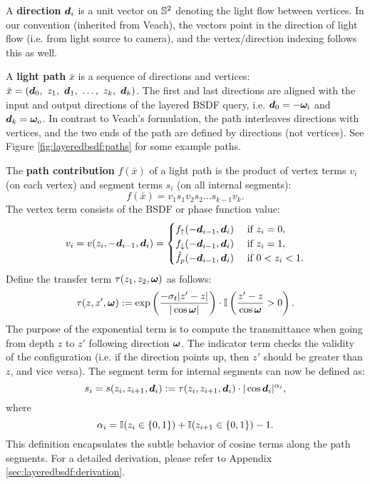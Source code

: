 A {\bf direction} $\bm{d}_i$ is a unit vector on $\mathbb{S}^2$ denoting the light flow between vertices. In our convention (inherited from Veach), 
the vectors point in the direction of light flow (i.e. from light source to camera), and the vertex/direction indexing follows this as well.

A {\bf light path} $\bar x$ is a sequence of directions and vertices: $\bar x = (\bmd_0,\ z_1,\ \bmd_1,\ \dots,\ z_k,\ \bmd_k)$.
The first and last directions are aligned with the input and output directions of the layered BSDF query, i.e. $\bm{d}_0 = -\bm\omega_\mathrm{i}$ and $\bm{d}_k = \bm\omega_\mathrm{o}$. In contrast to Veach's formulation, the path interleaves directions with vertices, and the two ends of the path are defined by directions (not vertices). See Figure \ref{fig:layeredbsdf:paths} for some example paths.



The {\bf path contribution} $f(\bar x)$ of a light path is the product of vertex terms $v_i$ (on each vertex) and segment terms $s_i$ (on all internal segments):
\begin{equation}
	f(\bar x) = v_1 s_1 v_2 s_2 \dots s_{k-1} v_k.
\end{equation}
The vertex term consists of the BSDF or phase function value:
\begin{equation}
\label{eqn:vtx_contrib}
v_i = v(z_i, -\bm{d}_{i - 1}, \bm{d}_i)
= \begin{cases}
	f_\uparrow(-\bm{d}_{i-1}, \bm{d}_i)   & \mbox{  if  } z_i = 0,\\
	f_\downarrow(-\bm{d}_{i-1}, \bm{d}_i) & \mbox{  if  } z_i = 1,\\
  	\hat{f}_p(-\bm{d}_{i-1}, \bm{d}_i)    & \mbox{  if  } 0 < z_i < 1.
\end{cases}
\end{equation}
Define the transfer term $\tau(z_1, z_2, \bm\omega)$ as follows:
\begin{equation}
\tau(z, z', \bm\omega) := \exp \left( \frac{-\sigma_t |z' - z|}{|\cos \bm\omega|} \right) \cdot \mathbb{I} \left( \frac{z' - z}{\cos \bm\omega} > 0 \right).
\end{equation}
The purpose of the exponential term is to compute the transmittance when going from depth $z$ to $z'$ following direction $\bm\omega$.
The indicator term checks the validity of the configuration (i.e. if the direction points up, then $z'$ should be greater than $z$, and vice versa). The segment term for internal segments can now be defined as:
\begin{equation}
\label{eqn:seg_contrib}
s_i = s(z_i, z_{i + 1}, \bm{d}_i) := \tau(z_i, z_{i+1}, \bm{d}_i) \cdot |\cos \bm{d}_i|^{\alpha_i},
\end{equation}
where
\begin{equation}
\label{eqn:seg_contrib_cosine}
\alpha_i = \mathbb{I}(z_i \in \{0,1\}) + \mathbb{I}(z_{i + 1} \in \{0,1\}) - 1.
\end{equation}
This definition encapsulates the subtle behavior of cosine terms along the path segments.
For a detailed derivation, please refer to Appendix \ref{sec:layeredbsdf:derivation}.

